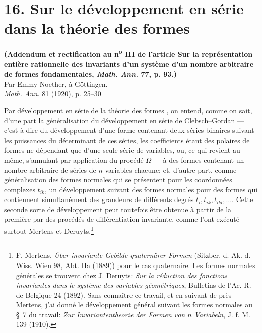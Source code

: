 \section*{16. Sur le développement en série dans la théorie des formes}
\begin{center}
\textbf{(Addendum et rectification au n\textsuperscript{o} III de l'article
\og{}Sur la représentation entière rationnelle des invariants d'un système d'un nombre arbitraire de formes fondamentales\fg{},
\emph{Math. Ann.} 77, p. 93.)}\\[0.65em]
Par Emmy Noether, à Göttingen.\\[0.65em]
\emph{Math. Ann.} 81 (1920), p. 25--30
\end{center}

Par \og{} développement en série de la théorie des formes \fg{}, on entend, comme on sait, d'une part la généralisation du développement en série de Clebsch--Gordan --- c'est-à-dire du développement d'une forme contenant deux séries binaires suivant les puissances du déterminant de ces séries, les coefficients étant des polaires de formes ne dépendant que d'une seule série de variables, ou, ce qui revient au même, s'annulant par application du procédé $\Omega$ --- à des formes contenant un nombre arbitraire de séries de $n$ variables chacune; et, d'autre part, comme généralisation des formes normales qui se présentent pour les \og{} coordonnées complexes \fg{} $t_{ik}$, un développement suivant des formes normales pour des formes qui contiennent simultanément des grandeurs de différents degrés $t_i,t_{ik},t_{ikl},\ldots$. Cette seconde sorte de développement peut toutefois être obtenue à partir de la première par des procédés de différentiation invariante, comme l'ont exécuté surtout Mertens et Deruyts.\footnote{F. Mertens, \emph{Über invariante Gebilde quaternärer Formen} (Sitzber. d. Ak. d. Wiss. Wien 98, Abt. IIa (1889)) pour le cas quaternaire. Les formes normales générales se trouvent chez J. Deruyts: \emph{Sur la réduction des fonctions invariantes dans le système des variables géométriques}, Bulletins de l'Ac. R. de Belgique 24 (1892). Sans connaître ce travail, et en suivant de près Mertens, j'ai donné le développement général suivant les formes normales au \S~7 du travail: \emph{Zur Invariantentheorie der Formen von $n$ Variabeln}, J. f. M. 139 (1910).}

